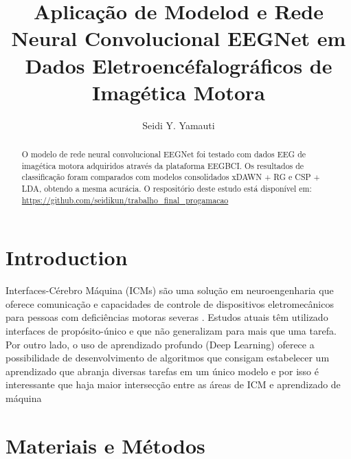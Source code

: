 \documentclass[conference,compsoc]{IEEEtran}
\begin{document}
%

\title{Aplicação de Modelod e Rede Neural Convolucional EEGNet em Dados Eletroencéfalográficos de Imagética Motora}


\author{Seidi Y. Yamauti\\
}

\maketitle

\begin{abstract}

O modelo de rede neural convolucional EEGNet foi testado com dados EEG de imagética motora adquiridos através da plataforma EEGBCI. Os resultados de classificação foram comparados com modelos consolidados xDAWN + RG e CSP + LDA, obtendo a mesma acurácia. O respositório deste estudo está disponível em: \url{https://github.com/seidikun/trabalho_final_progamacao}

\end{abstract}


\IEEEpeerreviewmaketitle


\section{Introduction}

Interfaces-Cérebro Máquina (ICMs) são uma solução em neuroengenharia que oferece comunicação e capacidades de controle de dispositivos eletromecânicos para pessoas com deficiências motoras severas \cite{nicolas2012brain}. Estudos atuais têm utilizado interfaces de propósito-único e que não generalizam para mais que uma tarefa. Por outro lado, o uso de aprendizado profundo (Deep Learning) oferece a possibilidade de desenvolvimento de algoritmos que consigam estabelecer um aprendizado que abranja diversas tarefas em um único modelo \cite{lecun2015deep} e por isso é interessante que haja maior intersecção entre as áreas de ICM e aprendizado de máquina


\section{Materiais e Métodos}
\end{document}
